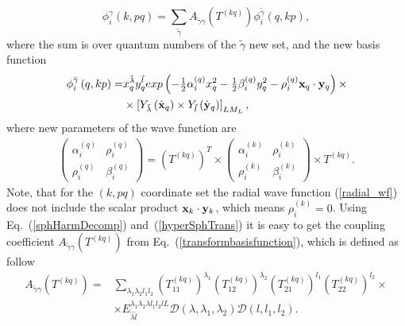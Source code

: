 \documentclass[12pt,a4paper,twoside]{article}
\begin{document}
  \begin{equation}
 \label{transformbasisfunction}
 \phi_{i}^{\gamma}\left(k, pq \right) = \sum_{\tilde{\gamma}} A_{\tilde{\gamma}\gamma}\left( T^{(kq)} \right)
  \phi_{i}^{\tilde{\gamma} } \left(q, kp \right) ,
 \end{equation}
where the sum is over quantum numbers of the $ \tilde {\gamma} $ new set, and the new basis function 
\begin{align}
\phi_{i}^{\tilde{\gamma} } \left(q, kp \right)  =  &
 x_{q}^{\tilde{\lambda}} y_{q}^{\tilde{l}} exp\left(- \tfrac{1}{2} \alpha^{(q)}_{i} x_{q}^{2} - \tfrac{1}{2} \beta^{(q)}_{i}  y_{q}^{2} - \rho^{(q)}_i {\bf x}_{q} \cdot {\bf y}_{q}  \right) 
\times  \nonumber \\ 
&\times  \left[ Y_{\tilde{\lambda}} \left(  \hat{ \bf x}_q \right) \times Y_{\tilde{l}} \left( \hat{\bf y}_q \right) \right]_{LM_L},
\label{newBasis}
\end{align}
where new parameters of the wave function are
\begin{align}
\begin{pmatrix}
\alpha_i^{(q)} & \rho_i^{(q)} \\ 
\rho_i^{(q)} & \beta_i^{(q)}
\end{pmatrix}  = \left( T^{(kq)} \right)^{T} \times 
\begin{pmatrix}
\alpha_i^{(k)} & \rho_i^{(k)} \\ 
\rho_i^{(k)} & \beta_i^{(k)}
\end{pmatrix} \times  T^{(kq)}.
\end{align}
Note, that for the $(k,pq)$ coordinate set the radial wave function (\ref{radial_wf}) does not include the scalar product ${\bf x}_k \cdot {\bf y}_k$, which means $\rho_i^{(k)}=0$.  
 Using Eq.~(\ref{sphHarmDecomp}) and~(\ref{hyperSphTrans}) it is easy to get the coupling coefficient $ A_{\tilde{\gamma} \gamma} \left( T^{(kq)} \right) $ from Eq.~(\ref{transformbasisfunction}), which is defined as follow 
 \begin{align}
A_{\tilde{\gamma}\gamma}\left( T^{(kq)} \right) = & \sum_{\lambda_1 \lambda_2 l_1 l_2} 
\left(T_{11}^{(kq)} \right)^{\lambda_1} 
\left(T_{12}^{(kq)} \right)^{\lambda_2} 
\left(T_{21}^{(kq)} \right)^{l_1} 
\left(T_{22}^{(kq)} \right)^{l_2} 
\times 
\\
& \times {E}^{\lambda_1 \lambda_2 \lambda l_1 l_2 l L}_{\tilde{\lambda} \tilde{l} } \mathcal{D}(\lambda,\lambda_1,\lambda_2) \mathcal{D}(l,l_1,l_2).   \nonumber 
\end{align}
\end{document}
